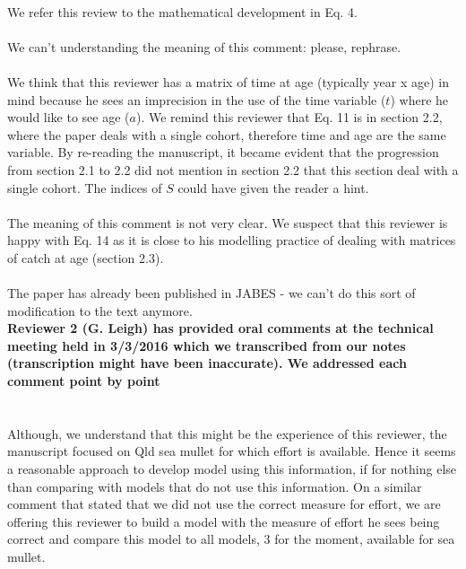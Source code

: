\documentclass[11pt]{article}
\begin{document}
\begin{spacing}{1.2}
{ \\
We refer this review to the mathematical development in Eq. 4. \\

 \\
We can't understanding the meaning of this comment: please, rephrase.\\

 \\
We think that this reviewer has a matrix of time at age (typically year x age) in mind because he sees an imprecision in the use of the time variable ($t$) where he would like to see age ($a$). We remind this reviewer that Eq. 11 is in section 2.2, where the paper deals with a single cohort, therefore time and age are the same variable. By re-reading the manuscript, it became evident that the progression from section 2.1 to 2.2 did not mention in section 2.2 that this section deal with a single cohort. The indices of $S$ could have given the reader a hint. \\

\\
The meaning of this comment is not very clear. We suspect that this reviewer is happy with Eq. 14 as it is close to his modelling practice of dealing with matrices of catch at age (section 2.3). \\

 \\
The paper has already been published in JABES - we can't do this sort of modification to the text anymore. \\

{\bf Reviewer 2 (G. Leigh) has provided oral comments at the technical meeting held in 3/3/2016 which we transcribed from our notes (transcription might have been inaccurate). We addressed each comment point by point}\\

 \\
 \\
Although, we understand that this might be the experience of this reviewer, the manuscript focused on Qld sea mullet for which effort is available. Hence it seems a reasonable approach to develop model using this information, if for nothing else than comparing with models that do not use this information. On a similar comment that stated that we did not use the correct measure for effort, we are offering this reviewer to build a model with the measure of effort he sees being correct and compare this model to all models, 3 for the moment, available for sea mullet. \\

}
\end{spacing}
\end{document}
